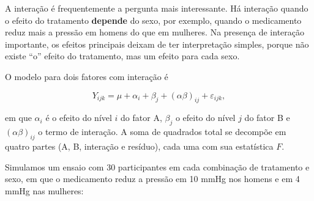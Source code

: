 \documentclass[
]{book}
\newenvironment{Shaded}{\begin{snugshade}}{\end{snugshade}}
\newcommand{\AttributeTok}[1]{\textcolor[rgb]{0.13,0.29,0.53}{#1}}
\newcommand{\DecValTok}[1]{\textcolor[rgb]{0.00,0.00,0.81}{#1}}
\newcommand{\FunctionTok}[1]{\textcolor[rgb]{0.13,0.29,0.53}{\textbf{#1}}}
\newcommand{\NormalTok}[1]{#1}
\newcommand{\OtherTok}[1]{\textcolor[rgb]{0.56,0.35,0.01}{#1}}
\newcommand{\SpecialCharTok}[1]{\textcolor[rgb]{0.81,0.36,0.00}{\textbf{#1}}}
\newcommand{\StringTok}[1]{\textcolor[rgb]{0.31,0.60,0.02}{#1}}
\begin{document}
A interação é frequentemente a pergunta mais interessante. Há interação quando o efeito do tratamento \textbf{depende} do sexo, por exemplo, quando o medicamento reduz mais a pressão em homens do que em mulheres. Na presença de interação importante, os efeitos principais deixam de ter interpretação simples, porque não existe ``o'' efeito do tratamento, mas um efeito para cada sexo.

O modelo para dois fatores com interação é

\[
Y_{ijk} = \mu + \alpha_i + \beta_j + (\alpha\beta)_{ij} + \varepsilon_{ijk},
\]

em que \(\alpha_i\) é o efeito do nível \(i\) do fator A, \(\beta_j\) o efeito do nível \(j\) do fator B e \((\alpha\beta)_{ij}\) o termo de interação. A soma de quadrados total se decompõe em quatro partes (A, B, interação e resíduo), cada uma com sua estatística \(F\).

Simulamos um ensaio com 30 participantes em cada combinação de tratamento e sexo, em que o medicamento reduz a pressão em 10 mmHg nos homens e em 4 mmHg nas mulheres:

\begin{Shaded}
\end{Shaded}
\end{document}
